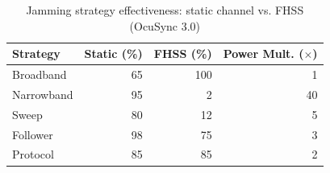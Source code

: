 \begin{table}[htbp]
\centering
\caption{Jamming strategy effectiveness: static channel vs. FHSS (OcuSync 3.0)}
\label{tab:fhss_effectiveness}
\begin{tabular}{lrrr}
\toprule
Strategy & Static (\%) & FHSS (\%) & Power Mult. ($\times$) \\
\midrule
Broadband & 65 & 100 & 1 \\
Narrowband & 95 & 2 & 40 \\
Sweep & 80 & 12 & 5 \\
Follower & 98 & 75 & 3 \\
Protocol & 85 & 85 & 2 \\
\bottomrule
\end{tabular}
\end{table}